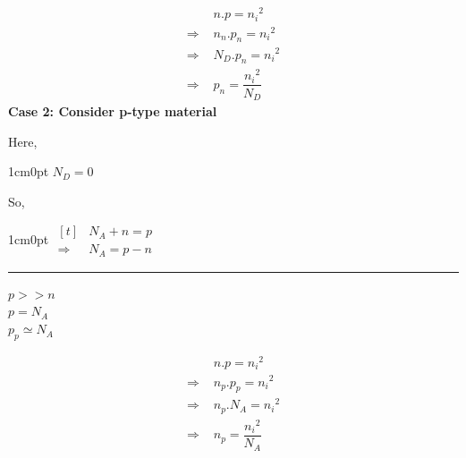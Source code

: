 \documentclass[a4aper,12pt]{report}
\begin{document}
\vspace*{-10pt}
\begin{align*}
    &n.p = {n_i}^2 \\ 
    \Rightarrow\, \,&n_n.p_n = {n_i}^2\\
    \Rightarrow \,\,&N_D.p_n = {n_i}^2 \\
    \Rightarrow\, \, &p_n = \dfrac{{n_i}^2}{N_D}
\end{align*}
\textbf{Case 2: Consider p-type material} 
\begin{center}\hspace*{2cm}
    \begin{minipage}{0.3\linewidth}
        Here, 
        \begin{adjustwidth}{1cm}{0pt}
            $N_D = 0$
        \end{adjustwidth}
        So, 
        \begin{adjustwidth}{1cm}{0pt}
            \hspace*{-0.5cm}
            $\begin{aligned}[t]
                & N_A + n = p \\
                \Rightarrow &N_A = p - n
            \end{aligned}$
        \end{adjustwidth}
    \end{minipage}
    \begin{minipage}{0.1\linewidth}
        \rule{1pt}{3cm}
    \end{minipage}
    \begin{minipage}{0.3\linewidth}
        $p >> n$ \\ [5pt]
        $p = N_A$ \\ [5pt]
        $p_p \simeq N_A$
    \end{minipage}
\end{center}
\vspace*{-10pt}
\begin{align*}
    &n.p = {n_i}^2 \\ 
    \Rightarrow\, \,&n_p.p_p = {n_i}^2\\
    \Rightarrow \,\,&n_p.N_A = {n_i}^2 \\
    \Rightarrow\, \, &n_p = \dfrac{{n_i}^2}{N_A}
\end{align*}
\end{document}
